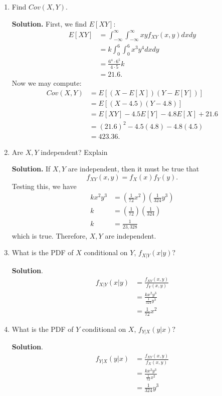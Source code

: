 \documentclass[12pt]{article}
\begin{document}
\begin{enumerate}
    \item Find $Cov(X,Y)$.

    \textbf{Solution.}
    First, we find $E[XY]$:
    \begin{align*}
        E[XY] &=  \int_{-\infty}^\infty\int_{-\infty}^\infty xy f_{XY}(x,y)dxdy 
        \\ &= k\int_0^6\int_0^6 x^3y^4dxdy 
        \\ &= \frac{6^4\cdot 6^5}{4\cdot 5}k
        \\ &= 21.6.
    \end{align*}
    Now we may compute:
    \begin{align*}
        Cov(X,Y) &= E[(X - E[X])(Y-E[Y])]
        \\ &= E[(X - 4.5)(Y-4.8)]
        \\ &= E[XY] - 4.5E[Y] - 4.8 E[X] + 21.6
        \\ &= (21.6)^2 - 4.5(4.8) - 4.8(4.5)
        \\ &= 423.36.
    \end{align*}

    \item Are $X,Y$ independent? Explain 

    \textbf{Solution.}
    If $X,Y$ are independent, then it must be true that \[ f_{XY}(x,y) = f_X(x)f_Y(y).\] Testing this, we have
    \begin{align*}
        kx^2y^3&= \left(\frac{1}{72}x^2\right)\left( \frac{1}{324}y^3\right)
        \\ k &= \left(\frac{1}{72}\right)\left( \frac{1}{324}\right)
        \\ k&= \frac{1}{23,328}
    \end{align*}
    which is true. Therefore, $X,Y$ are independent. 

    \item What is the PDF of $X$ conditional on $Y$, $f_{X|Y}(x|y)?$

    \textbf{Solution}.
    \begin{align*}
        f_{X|Y}(x|y) &= \frac{f_{XY}(x,y)}{f_Y(x,y)}
        \\ &= \frac{kx^2y^3}{ \frac{1}{324}y^3}
        \\ &= \frac{1}{72}x^2
    \end{align*}

    \item What is the PDF of $Y$ conditional on $X$, $f_{Y|X}(y|x)?$

    \textbf{Solution}.
    \begin{align*}
        f_{Y|X}(y|x) &= \frac{f_{XY}(x,y)}{f_X(x,y)}
        \\ &= \frac{kx^2y^3}{ \frac{1}{72}x^2}
        \\ &= \frac{1}{324}y^3
    \end{align*}
\end{enumerate}
\end{document}
